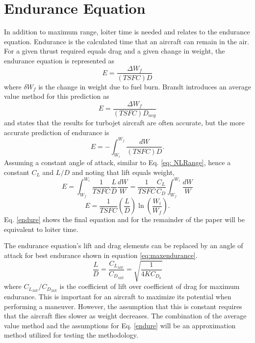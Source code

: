 \section{Endurance Equation}
In addition to maximum range, loiter time is needed and relates to the endurance equation. Endurance is the calculated time that an aircraft can remain in the air. For a given thrust required equals drag and a given change in weight, the endurance equation is represented as
\begin{equation}
    E = \dfrac{\Delta W_f}{(TSFC)D}
\end{equation}
where $\delta W_f$ is the change in weight due to fuel burn. Brandt \cite{IntrotoAero} introduces an average value method for this prediction as
\begin{equation}
    E = \dfrac{\Delta W_f}{(TSFC)D_{avg}}
\end{equation}
and states that the results for turbojet aircraft are often accurate, but the more accurate prediction of endurance is
\begin{equation}
    E = -\int_{W_i}^{W_f}\dfrac{dW}{(TSFC)D}.
\end{equation}
Assuming a constant angle of attack, similar to Eq. \ref{eq: NLRange}, hence a constant $C_L$ and $L/D$ and noting that lift equals weight,
\begin{equation*}
    E = \int_{W_f}^{W_i}\dfrac{1}{TSFC}\dfrac{L}{D}\dfrac{dW}{W} = \dfrac{1}{TSFC}\dfrac{C_L}{C_D}\int_{W_f}^{W_i}\dfrac{dW}{W}
\end{equation*}
\begin{equation}
\label{endure}
    E = \dfrac{1}{TSFC}\left(\dfrac{L}{D}\right) \ln\left(\dfrac{W_i}{W_f}\right).
\end{equation}
Eq. \ref{endure} shows the final equation and for the remainder of the paper will be equivalent to loiter time.\par
The endurance equation's lift and drag elements can be replaced by an angle of attack for best endurance \cite{OptimizeBreguet} shown in equation \ref{eq:maxendurance}.
\begin{equation}
\label{eq:maxendurance}
\dfrac{L}{D} = \dfrac{C_{L_{ME}}}{C_{D_{ME}}} = \sqrt{\dfrac{1}{4KC_{D_0}}}
\end{equation}
where $C_{L_{ME}}/C_{D_{ME}}$ is the coefficient of lift over coefficient of drag for maximum endurance. This is important for an aircraft to maximize its potential when performing a maneuver. However, the assumption that this is constant requires that the aircraft flies slower as weight decreases. The combination of the average value method and the assumptions for Eq. \ref{endure} will be an approximation method utilized for testing the methodology.

